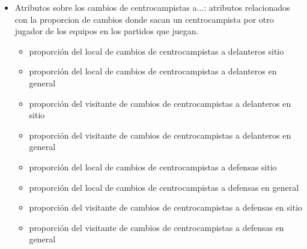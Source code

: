 \begin{itemize}
\begin{itemize}
    \end{itemize}
    \item Atributos sobre los cambios de centrocampistas a...: atributos relacionados con la proporcion de cambios donde sacan un centrocampista por otro jugador de los equipos en los partidos que juegan.
    \begin{itemize}
        \item proporción del local de cambios de centrocampistas a delanteros sitio
        \item proporción del local de cambios de centrocampistas a delanteros en general
        \item proporción del visitante de cambios de centrocampistas a delanteros en sitio
        \item proporción del visitante de cambios de centrocampistas a delanteros en general
        \item proporción del local de cambios de centrocampistas a defensas sitio
        \item proporción del local de cambios de centrocampistas a defensas en general
        \item proporción del visitante de cambios de centrocampistas a defensas en sitio
        \item proporción del visitante de cambios de centrocampistas a defensas en general
        

\end{itemize}
\end{itemize}
